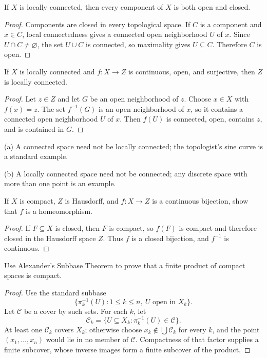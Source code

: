 \begin{thm}
If $X$ is locally connected, then every component of $X$ is both open and
closed.
\end{thm}

\begin{proof}
Components are closed in every topological space. If $C$ is a component and
$x\in C$, local connectedness gives a connected open neighborhood $U$ of
$x$. Since $U\cap C\neq\varnothing$, the set $U\cup C$ is connected, so
maximality gives $U\subseteq C$. Therefore $C$ is open.
\end{proof}

\begin{thm}
If $X$ is locally connected and $f:X\to Z$ is continuous, open, and
surjective, then $Z$ is locally connected.
\end{thm}

\begin{proof}
Let $z\in Z$ and let $G$ be an open neighborhood of $z$. Choose $x\in X$
with $f(x)=z$. The set $f^{-1}(G)$ is an open neighborhood of $x$, so it
contains a connected open neighborhood $U$ of $x$. Then $f(U)$ is connected,
open, contains $z$, and is contained in $G$.
\end{proof}

\begin{eg}
(a) A connected space need not be locally connected; the topologist's sine
curve is a standard example.

(b) A locally connected space need not be connected; any discrete space with
more than one point is an example.
\end{eg}

\begin{ex}
If $X$ is compact, $Z$ is Hausdorff, and $f:X\to Z$ is a continuous
bijection, show that $f$ is a homeomorphism.
\end{ex}

\begin{proof}
If $F\subseteq X$ is closed, then $F$ is compact, so $f(F)$ is compact and
therefore closed in the Hausdorff space $Z$. Thus $f$ is a closed bijection,
and $f^{-1}$ is continuous.
\end{proof}

\begin{ex}
Use Alexander's Subbase Theorem to prove that a finite product of compact
spaces is compact.
\end{ex}

\begin{proof}
Use the standard subbase
\[
\{\pi_k^{-1}(U):1\leq k\leq n,\ U\text{ open in }X_k\}.
\]
Let $\mathcal{C}$ be a cover by such sets. For each $k$, let
\[
\mathcal{C}_k=\{U\subseteq X_k:\pi_k^{-1}(U)\in\mathcal{C}\}.
\]
At least one $\mathcal{C}_k$ covers $X_k$; otherwise choose
$x_k\notin\bigcup\mathcal{C}_k$ for every $k$, and the point
$(x_1,\ldots,x_n)$ would lie in no member of $\mathcal{C}$. Compactness of
that factor supplies a finite subcover, whose inverse images form a finite
subcover of the product.
\end{proof}

